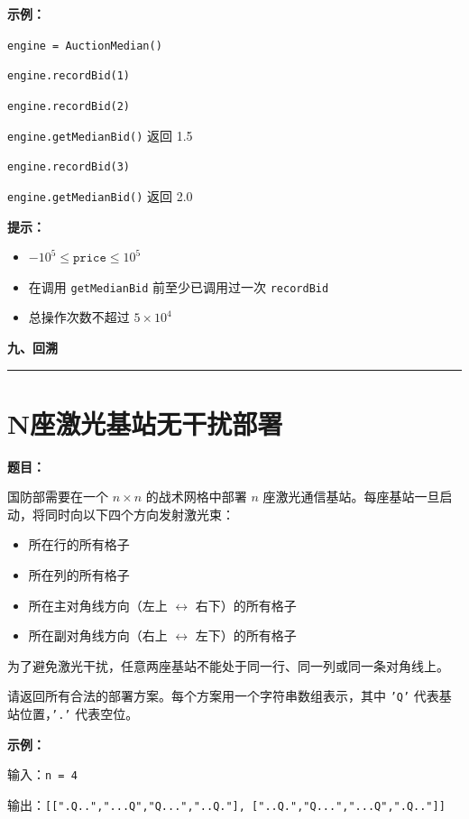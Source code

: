 \documentclass[12pt, a4paper]{article}
\newcommand{\category}[1]{%
  \vspace{1.2cm}
  {\noindent\Large\bfseries #1}
  \vspace{0.2em}\par
  \noindent\rule{\textwidth}{0.8pt}
  \vspace{0.2em}
}
\begin{document}
\textbf{示例：}

\texttt{engine = AuctionMedian()}

\texttt{engine.recordBid(1)}

\texttt{engine.recordBid(2)}

\texttt{engine.getMedianBid()} \quad 返回 1.5

\texttt{engine.recordBid(3)}

\texttt{engine.getMedianBid()} \quad 返回 2.0

\textbf{提示：}
\begin{itemize}[leftmargin=2em]
  \item $-10^5 \leq \texttt{price} \leq 10^5$
  \item 在调用 \texttt{getMedianBid} 前至少已调用过一次 \texttt{recordBid}
  \item 总操作次数不超过 $5 \times 10^4$
\end{itemize}



\category{九、回溯}

\section{N座激光基站无干扰部署}

\noindent\textbf{题目：}

国防部需要在一个 $n \times n$ 的战术网格中部署 $n$ 座激光通信基站。每座基站一旦启动，将同时向以下四个方向发射激光束：
\begin{itemize}[leftmargin=2em]
  \item 所在行的所有格子
  \item 所在列的所有格子
  \item 所在主对角线方向（左上 $\leftrightarrow$ 右下）的所有格子
  \item 所在副对角线方向（右上 $\leftrightarrow$ 左下）的所有格子
\end{itemize}

为了避免激光干扰，任意两座基站不能处于同一行、同一列或同一条对角线上。

请返回所有合法的部署方案。每个方案用一个字符串数组表示，其中 \texttt{'Q'} 代表基站位置，\texttt{'.'} 代表空位。

\textbf{示例：}

输入：\texttt{n = 4}

输出：\texttt{[[".Q..","...Q","Q...","..Q."], ["..Q.","Q...","...Q",".Q.."]]}
\end{document}
